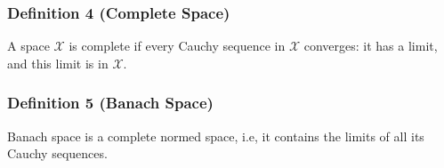 \subsubsection{Definition 4 (Complete Space)}
A space $\mathcal{X}$ is complete if every Cauchy sequence in $\mathcal{X}$ converges: it has a limit, and this limit is in $\mathcal{X}$.

\subsubsection{Definition 5 (Banach Space)}
Banach space is a complete normed space, i.e, it contains the limits of all its Cauchy sequences. 

